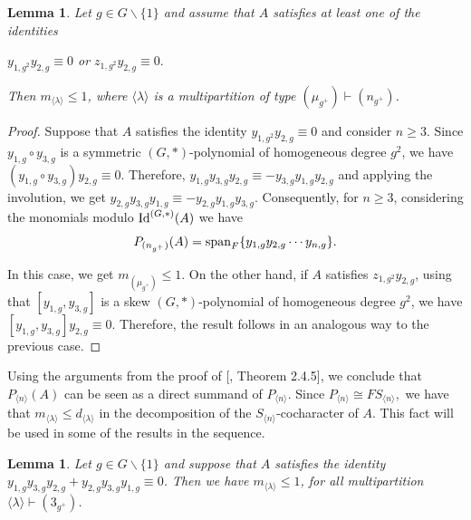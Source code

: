 \documentclass{amsart}
\newcommand{\IdG}{\ensuremath{\textnormal{Id}^{(G,\ast)}}}
\newcommand{\spam}{\ensuremath{\textnormal{span}}}
\newtheorem{lema}[teorema]{Lemma}
\numberwithin{equation}{section}
\begin{document}
\begin{lema}\label{lema1F} 
 Let $g\in G\backslash \{1\}$ and assume that $A$ satisfies at least one of the identities
	\begin{center}
		$y_{1,g^2}y_{2,g}\equiv 0$ \;  or \;$z_{1,g^2}y_{2,g}\equiv 0.$
	\end{center}
	Then $m_{\langle \lambda \rangle}\le 1$, where $\langle \lambda \rangle$ is a multipartition of type $(\mu_{g^+})\vdash (n_{g^+})$.

\end{lema} 
\begin{proof} 
  

Suppose that $A$ satisfies the identity $y_{1,g^2}y_{2,g}\equiv 0$ and consider $n\geq 3$. Since $y_{1,g}\circ y_{3,g}$ is a symmetric $(G,*)$-polynomial of homogeneous degree $g^2$, we have $(y_{1,g}\circ y_{3,g})y_{2,g}\equiv 0$. Therefore, $y_{1,g}y_{3,g}y_{2,g}\equiv -y_{3,g}y_{1,g}y_{2,g}$ and applying the involution, we get $y_{2,g}y_{3,g}y_{1,g}\equiv -y_{2,g}y_{1,g}y_{3,g}$.	Consequently, for $n\geq 3$, considering the monomials modulo $\IdG(A)$ we have 
    $$P_{(n_{g^+})}(A)=\spam_F\{y_{1,g}y_{2,g}\cdots y_{n,g}\}.$$ 
    
    In this case, we get $m_{(\mu_{g^+})}\leq 1.$ On the other hand, 
if $A$ satisfies $z_{1,g^2}y_{2,g}$, using that $[y_{1,g}, y_{3,g}]$ is a  skew $(G,*)$-polynomial of homogeneous degree $g^2$, we have $[y_{1,g}, y_{3,g}]y_{2,g}\equiv 0.$ Therefore, the result follows in an analogous  way to the previous case. 
\end{proof}

Using the arguments from the proof of [\cite{livroGZ}, Theorem 2.4.5], we conclude that $P_{\langle n \rangle}(A)$ can be seen as a direct summand of $P_{\langle n \rangle}$. Since $P_{\langle n \rangle}\cong FS_{\langle n \rangle},$ we have that $m_{\langle \lambda \rangle}\leq d_{\langle \lambda \rangle}$ in the decomposition of the $S_{\langle n \rangle}$-cocharacter of $A$. This fact will be used in some of the  results in the sequence. 
  

\begin{lema}\label{lemmanovo} Let $g\in G\backslash \{1\}$ and suppose that $A$ satisfies the identity $y_{1,g}y_{3,g}y_{2,g}+y_{2,g}y_{3,g}y_{1,g}\equiv 0$. Then we have $m_{\langle \lambda \rangle}\le 1$, for all multipartition $\langle \lambda \rangle \vdash (3_{g^+})$.  
		\end{lema} 
\end{document}
